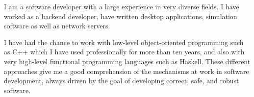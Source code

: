 
\begin{cvparagraph}

    I am a software developer with a large experience in very diverse fields.
    I have worked as a backend developer, have written desktop applications,
    simulation software as well as network servers.

    I have had the chance to work with low-level object-oriented programming
    such as C++ which I have used professionally for more than ten years, and
    also with very high-level functional programming languages such as Haskell.
    These different approaches give me a good comprehension of the mechanisms
    at work in software development, always driven by the goal of developing
    correct, safe, and robust software.

\end{cvparagraph}

